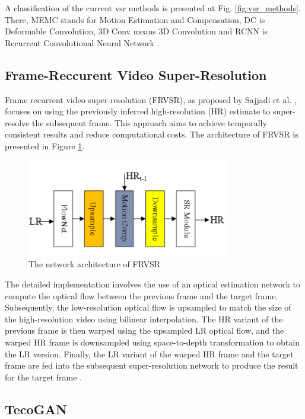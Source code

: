 \documentclass[conference]{IEEEtran}
\begin{document}
A classification of the current \acrshort{vsr} methods is presented at Fig. \ref{fig:vsr_methods}. There, MEMC stands for Motion Estimation and Compensation, DC is Deformable Convolution, 3D Conv means 3D Convolution and RCNN is Recurrent Convolutional Neural Network \cite{video_super_resolution_survey_2020}.

\subsection{Frame-Reccurent Video Super-Resolution}

Frame recurrent video super-resolution (FRVSR), as proposed by Sajjadi et al. \cite{frvsr_2018}, focuses on using the previously inferred high-resolution (HR) estimate to super-resolve the subsequent frame. This approach aims to achieve temporally consistent results and reduce computational costs. The architecture of FRVSR is presented in Figure \ref{fig:frvsr_arch}.

\begin{figure}[t]
    \centering
    \centerline{\includegraphics[width=8.9cm]{frvsr_arch}}
    \caption{The network architecture of FRVSR \cite{video_super_resolution_survey_2020}}
    \label{fig:frvsr_arch}
\end{figure}

The detailed implementation involves the use of an optical estimation network to compute the optical flow between the previous frame and the target frame. Subsequently, the low-resolution optical flow is upsampled to match the size of the high-resolution video using bilinear interpolation. The HR variant of the previous frame is then warped using the upsampled LR optical flow, and the warped HR frame is downsampled using space-to-depth transformation to obtain the LR version. Finally, the LR variant of the warped HR frame and the target frame are fed into the subsequent super-resolution network to produce the result for the target frame \cite{video_super_resolution_survey_2020}.

\subsection{TecoGAN}
\end{document}
